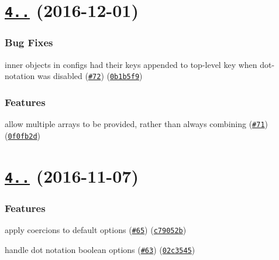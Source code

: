 \label{_4.2.0}%
 \section*{\href{https://github.com/yargs/yargs-parser/compare/v4.1.0...v4.2.0}{\tt 4..} (2016-\/12-\/01)}

\subsubsection*{Bug Fixes}


\begin{DoxyItemize}
\item inner objects in configs had their keys appended to top-\/level key when dot-\/notation was disabled (\href{https://github.com/yargs/yargs-parser/issues/72}{\tt \#72}) (\href{https://github.com/yargs/yargs-parser/commit/0b1b5f9}{\tt 0b1b5f9})
\end{DoxyItemize}

\subsubsection*{Features}


\begin{DoxyItemize}
\item allow multiple arrays to be provided, rather than always combining (\href{https://github.com/yargs/yargs-parser/issues/71}{\tt \#71}) (\href{https://github.com/yargs/yargs-parser/commit/0f0fb2d}{\tt 0f0fb2d})
\end{DoxyItemize}

\label{_4.1.0}%
 \section*{\href{https://github.com/yargs/yargs-parser/compare/v4.0.2...v4.1.0}{\tt 4..} (2016-\/11-\/07)}

\subsubsection*{Features}


\begin{DoxyItemize}
\item apply coercions to default options (\href{https://github.com/yargs/yargs-parser/issues/65}{\tt \#65}) (\href{https://github.com/yargs/yargs-parser/commit/c79052b}{\tt c79052b})
\item handle dot notation boolean options (\href{https://github.com/yargs/yargs-parser/issues/63}{\tt \#63}) (\href{https://github.com/yargs/yargs-parser/commit/02c3545}{\tt 02c3545})
\end{DoxyItemize}

